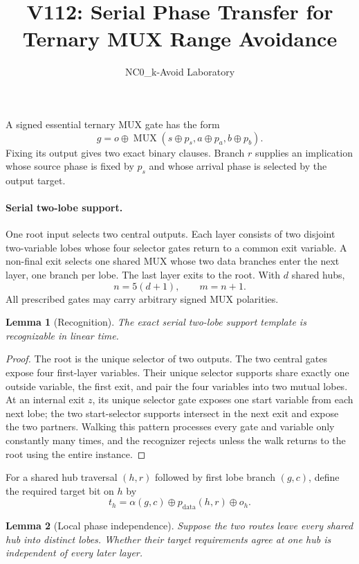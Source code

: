 \documentclass[11pt]{article}
\newtheorem{lemma}{Lemma}
\begin{document}
\title{V112: Serial Phase Transfer for Ternary MUX Range Avoidance}
\author{NC0\_k-Avoid Laboratory}
\date{}
\maketitle

A signed essential ternary MUX gate has the form
\[
 g=o\oplus \operatorname{MUX}(s\oplus p_s,a\oplus p_a,b\oplus p_b).
\]
Fixing its output gives two exact binary clauses.  Branch $r$ supplies an implication
whose source phase is fixed by $p_s$ and whose arrival phase is selected by the output
target.

\paragraph{Serial two-lobe support.}
One root input selects two central outputs.  Each layer consists of two disjoint
two-variable lobes whose four selector gates return to a common exit variable.  A
non-final exit selects one shared MUX whose two data branches enter the next layer,
one branch per lobe.  The last layer exits to the root.  With $d$ shared hubs,
\[
 n=5(d+1),\qquad m=n+1.
\]
All prescribed gates may carry arbitrary signed MUX polarities.

\begin{lemma}[Recognition]
The exact serial two-lobe support template is recognizable in linear time.
\end{lemma}

\begin{proof}
The root is the unique selector of two outputs.  The two central gates expose four
first-layer variables.  Their unique selector supports share exactly one outside
variable, the first exit, and pair the four variables into two mutual lobes.  At an
internal exit $z$, its unique selector gate exposes one start variable from each next
lobe; the two start-selector supports intersect in the next exit and expose the two
partners.  Walking this pattern processes every gate and variable only constantly many
times, and the recognizer rejects unless the walk returns to the root using the entire
instance.
\end{proof}

For a shared hub traversal $(h,r)$ followed by first lobe branch $(g,c)$, define the
required target bit on $h$ by
\[
 t_h=\alpha(g,c)\oplus p_{\mathrm{data}}(h,r)\oplus o_h.
\]

\begin{lemma}[Local phase independence]
Suppose the two routes leave every shared hub into distinct lobes.  Whether their
target requirements agree at one hub is independent of every later layer.
\end{lemma}
\end{document}
